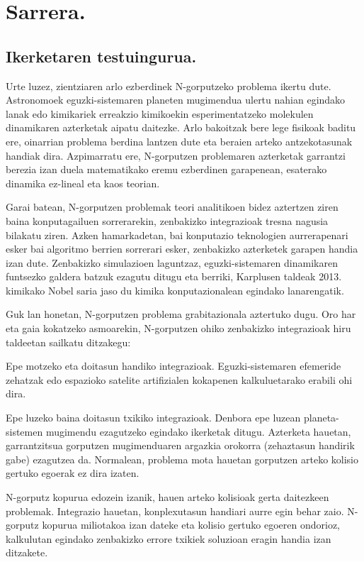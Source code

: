 \chapter{Sarrera.}


\section{Ikerketaren testuingurua.}

Urte luzez, zientziaren arlo ezberdinek N-gorputzeko problema ikertu dute. Astronomoek eguzki-sistemaren planeten mugimendua ulertu nahian egindako lanak edo kimikariek erreakzio kimikoekin esperimentatzeko molekulen dinamikaren azterketak aipatu daitezke. Arlo bakoitzak bere lege fisikoak baditu ere, oinarrian problema berdina lantzen dute eta beraien arteko antzekotasunak handiak dira. Azpimarratu ere,  N-gorputzen problemaren azterketak garrantzi berezia izan duela matematikako eremu ezberdinen garapenean, esaterako dinamika ez-lineal eta kaos teorian. 

Garai batean, N-gorputzen problemak teori analitikoen bidez aztertzen ziren baina konputagailuen sorrerarekin, zenbakizko integrazioak tresna nagusia bilakatu ziren. Azken hamarkadetan, bai konputazio teknologien aurrerapenari esker bai algoritmo berrien sorrerari esker, zenbakizko azterketek garapen handia izan dute. Zenbakizko simulazioen laguntzaz, eguzki-sistemaren dinamikaren funtsezko galdera batzuk ezagutu ditugu eta berriki, Karplusen taldeak 2013. kimikako Nobel saria \cite{Karplus2014} jaso du kimika konputazionalean egindako lanarengatik.       

Guk lan honetan, N-gorputzen problema grabitazionala aztertuko dugu. Oro har eta gaia kokatzeko asmoarekin, N-gorputzen ohiko zenbakizko  integrazioak hiru taldeetan sailkatu ditzakegu:
\begin{enumerate}
{
\item Epe motzeko eta doitasun handiko integrazioak. 
 Eguzki-sistemaren efemeride zehatzak edo espazioko satelite artifizialen kokapenen kalkuluetarako erabili ohi dira.
\item Epe luzeko baina doitasun txikiko integrazioak.
 Denbora epe luzean planeta-sistemen mugimendu ezagutzeko egindako ikerketak ditugu. Azterketa hauetan, garrantzitsua  gorputzen mugimenduaren argazkia orokorra (zehaztasun handirik gabe) ezagutzea da. Normalean, problema mota hauetan gorputzen arteko kolisio gertuko egoerak ez dira izaten.     
\item N-gorputz kopurua edozein izanik, hauen arteko kolisioak gerta daitezkeen problemak.
 Integrazio hauetan, konplexutasun handiari aurre egin behar zaio. N-gorputz kopurua miliotakoa izan dateke eta kolisio gertuko egoeren ondorioz, kalkulutan egindako zenbakizko errore txikiek soluzioan eragin handia izan ditzakete.    
}
\end{enumerate}

